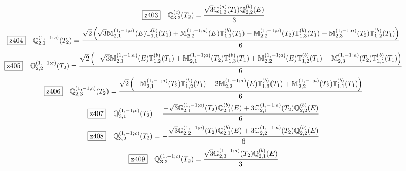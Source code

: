 \documentclass[fleqn,10pt,landscape]{jsarticle}
\begin{document}
\begin{dmath*}
\hspace*{3mm}\fbox{z403}\quad \mathbb{Q}_{3,3}^{(c)}(T_{2})=\frac{\sqrt{3} \mathbb{Q}_{1,3}^{(a)}(T_{1}) \mathbb{Q}_{2,2}^{(b)}(E)}{3}
\end{dmath*}
\begin{dmath*}
\hspace*{3mm}\fbox{z404}\quad \mathbb{Q}_{2,1}^{(1,-1;c)}(T_{2})=\frac{\sqrt{2} \left(\sqrt{3} \mathbb{M}_{2,1}^{(1,-1;a)}(E) \mathbb{T}_{1,1}^{(b)}(T_{1}) + \mathbb{M}_{2,2}^{(1,-1;a)}(E) \mathbb{T}_{1,1}^{(b)}(T_{1}) - \mathbb{M}_{2,2}^{(1,-1;a)}(T_{2}) \mathbb{T}_{1,3}^{(b)}(T_{1}) + \mathbb{M}_{2,3}^{(1,-1;a)}(T_{2}) \mathbb{T}_{1,2}^{(b)}(T_{1})\right)}{6}
\end{dmath*}
\begin{dmath*}
\hspace*{3mm}\fbox{z405}\quad \mathbb{Q}_{2,2}^{(1,-1;c)}(T_{2})=\frac{\sqrt{2} \left(- \sqrt{3} \mathbb{M}_{2,1}^{(1,-1;a)}(E) \mathbb{T}_{1,2}^{(b)}(T_{1}) + \mathbb{M}_{2,1}^{(1,-1;a)}(T_{2}) \mathbb{T}_{1,3}^{(b)}(T_{1}) + \mathbb{M}_{2,2}^{(1,-1;a)}(E) \mathbb{T}_{1,2}^{(b)}(T_{1}) - \mathbb{M}_{2,3}^{(1,-1;a)}(T_{2}) \mathbb{T}_{1,1}^{(b)}(T_{1})\right)}{6}
\end{dmath*}
\begin{dmath*}
\hspace*{3mm}\fbox{z406}\quad \mathbb{Q}_{2,3}^{(1,-1;c)}(T_{2})=\frac{\sqrt{2} \left(- \mathbb{M}_{2,1}^{(1,-1;a)}(T_{2}) \mathbb{T}_{1,2}^{(b)}(T_{1}) - 2 \mathbb{M}_{2,2}^{(1,-1;a)}(E) \mathbb{T}_{1,3}^{(b)}(T_{1}) + \mathbb{M}_{2,2}^{(1,-1;a)}(T_{2}) \mathbb{T}_{1,1}^{(b)}(T_{1})\right)}{6}
\end{dmath*}
\begin{dmath*}
\hspace*{3mm}\fbox{z407}\quad \mathbb{Q}_{3,1}^{(1,-1;c)}(T_{2})=\frac{- \sqrt{3} \mathbb{G}_{2,1}^{(1,-1;a)}(T_{2}) \mathbb{Q}_{2,1}^{(b)}(E) + 3 \mathbb{G}_{2,1}^{(1,-1;a)}(T_{2}) \mathbb{Q}_{2,2}^{(b)}(E)}{6}
\end{dmath*}
\begin{dmath*}
\hspace*{3mm}\fbox{z408}\quad \mathbb{Q}_{3,2}^{(1,-1;c)}(T_{2})=- \frac{\sqrt{3} \mathbb{G}_{2,2}^{(1,-1;a)}(T_{2}) \mathbb{Q}_{2,1}^{(b)}(E) + 3 \mathbb{G}_{2,2}^{(1,-1;a)}(T_{2}) \mathbb{Q}_{2,2}^{(b)}(E)}{6}
\end{dmath*}
\begin{dmath*}
\hspace*{3mm}\fbox{z409}\quad \mathbb{Q}_{3,3}^{(1,-1;c)}(T_{2})=\frac{\sqrt{3} \mathbb{G}_{2,3}^{(1,-1;a)}(T_{2}) \mathbb{Q}_{2,1}^{(b)}(E)}{3}
\end{dmath*}
\end{document}
